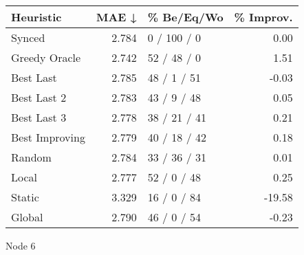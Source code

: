 \begin{tabular}{lrlr}
\toprule
\textbf{Heuristic} & \textbf{MAE ↓} & \textbf{\% Be/Eq/Wo} & \textbf{\% Improv.} \\
\midrule
            Synced &          2.784 &          0 / 100 / 0 &                0.00 \\
     Greedy Oracle &          2.742 &          52 / 48 / 0 &                1.51 \\
         Best Last &          2.785 &          48 / 1 / 51 &               -0.03 \\
       Best Last 2 &          2.783 &          43 / 9 / 48 &                0.05 \\
       Best Last 3 &          2.778 &         38 / 21 / 41 &                0.21 \\
    Best Improving &          2.779 &         40 / 18 / 42 &                0.18 \\
            Random &          2.784 &         33 / 36 / 31 &                0.01 \\
             Local &          2.777 &          52 / 0 / 48 &                0.25 \\
            Static &          3.329 &          16 / 0 / 84 &              -19.58 \\
            Global &          2.790 &          46 / 0 / 54 &               -0.23 \\
\bottomrule
\end{tabular}
\caption{Node 6}
\label{tab:hr_iid_lr01_le2_bs4_6}
